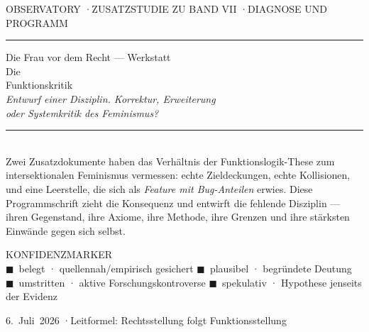 \documentclass[11pt]{article}
\begin{document}
\begin{titlepage}
\thispagestyle{empty}
\colorbox{obsbg}{%
\begin{minipage}[t][\paperheight][t]{\paperwidth}
\color{obspaper}
\vspace{2.6cm}
\hspace{2.3cm}\begin{minipage}{0.82\textwidth}
{\ttfamily\footnotesize\color{obsaccent}OBSERVATORY \quad·\quad ZUSATZSTUDIE ZU BAND VII \quad·\quad DIAGNOSE UND PROGRAMM}\\[0.3em]
{\color{obsmuted}\rule{\linewidth}{0.4pt}}

\vspace{2.4cm}
{\grotesklight\fontsize{15}{18}\selectfont\color{obsline} Die Frau vor dem Recht --- Werkstatt}\\[0.7em]
{\groteskmed\fontsize{40}{46}\selectfont Die\\[0.15em] Funktionskritik}\\[1.1em]
{\grotesklight\fontsize{16}{22}\selectfont\color{obsline}\itshape
Entwurf einer Disziplin. Korrektur, Erweiterung\\ oder Systemkritik des Feminismus?}

\vspace{2.2cm}
{\color{obsmuted}\rule{\linewidth}{0.4pt}}\\[0.5em]
{\grotesklight\normalsize\color{obsline}
Zwei Zusatzdokumente haben das Verhältnis der Funktionslogik-These zum
intersektionalen Feminismus vermessen: echte Zieldeckungen, echte Kollisionen,
und eine Leerstelle, die sich als \textit{Feature mit Bug-Anteilen} erwies.
Diese Programmschrift zieht die Konsequenz und entwirft die fehlende
Disziplin --- ihren Gegenstand, ihre Axiome, ihre Methode, ihre Grenzen und
ihre stärksten Einwände gegen sich selbst.}

\vspace{1.6cm}
{\ttfamily\scriptsize\color{obsline}
KONFIDENZMARKER\\[0.5em]
\textcolor{cbelegt}{$\blacksquare$}~belegt · quellennah/empirisch gesichert \qquad
\textcolor{cplausibel}{$\blacksquare$}~plausibel · begr\"undete Deutung\\[0.3em]
\textcolor{cumstritten}{$\blacksquare$}~umstritten · aktive Forschungskontroverse \qquad
\textcolor{cspekulativ}{$\blacksquare$}~spekulativ · Hypothese jenseits der Evidenz}

\vfill
{\ttfamily\footnotesize\color{obsmuted}6.~Juli~2026 \quad·\quad Leitformel: Rechtsstellung folgt Funktionsstellung}
\vspace{2cm}
\end{minipage}
\end{minipage}}
\restoregeometry
\end{titlepage}

\tableofcontents
\thispagestyle{empty}
\clearpage


\end{document}
